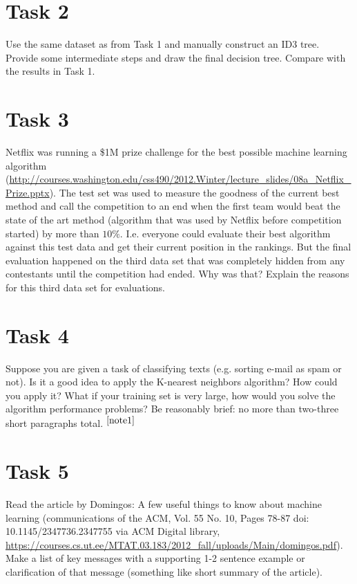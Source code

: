 \documentclass{article}
\newcommand{\footref}[1]{%
    $^{\ref{#1}}$%
}
\begin{document}
\section*{Task 2}
Use the same dataset as from Task 1 and manually construct an ID3 tree. Provide some intermediate steps and draw the final decision tree. Compare with the results in Task 1. 

\section*{Task 3}
Netflix was running a \$1M prize challenge for the best possible machine learning algorithm (\url{http://courses.washington.edu/css490/2012.Winter/lecture_slides/08a_Netflix_Prize.pptx}). The test set was used to measure the goodness of the current best method and call the competition to an end when the first team would beat the state of the art method (algorithm that was used by Netflix before competition started) by more than $10\%$. I.e. everyone could evaluate their best algorithm against this test data and get their current position  in the rankings. But the final evaluation happened on the third data set that was completely hidden from any contestants until the competition had ended. Why was that? Explain the reasons for this third data set for evaluations.

\section*{Task 4}
Suppose you are given a task of classifying texts (e.g. sorting e-mail as spam or not). Is it a good idea to apply the K-nearest neighbors algorithm? How could you apply it? What if your training set is very large, how would you solve the algorithm performance problems?
Be reasonably brief: no more than two-three short paragraphs total.\footref{note1}

\section*{Task 5}
Read the article by Domingos: A few useful things to know about machine learning (communications of the ACM, Vol. 55 No. 10, Pages 78-87 doi: 10.1145/2347736.2347755 via ACM Digital library, \url{https://courses.cs.ut.ee/MTAT.03.183/2012_fall/uploads/Main/domingos.pdf}). Make a list of key messages with a supporting 1-2 sentence example or clarification of that message (something like short summary of the article).
\end{document}
